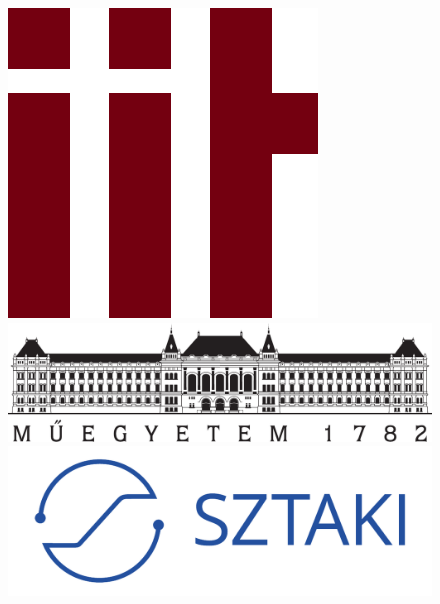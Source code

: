 \thispagestyle{empty}
\begin{figure}
\centering
\begin{minipage}{0.2\textwidth}
	\raggedright
		\includegraphics[width=.5\linewidth]{Fig/logo.png}

\end{minipage}
\begin{minipage}{0.55\textwidth}
	\centering

		\includegraphics[width=.9\linewidth]{Fig/bme_logo_nagy.pdf}
\end{minipage}
\begin{minipage}{0.2\textwidth}
	\raggedleft
		\includegraphics[width=\linewidth]{Fig/sztaki_logo_2019_uj_kek.pdf}
\end{minipage}		
\end{figure}

